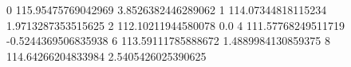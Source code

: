 0 115.95475769042969 3.8526382446289062
1 114.07344818115234 1.9713287353515625
2 112.10211944580078 0.0
4 111.57768249511719 -0.5244369506835938
6 113.59111785888672 1.4889984130859375
8 114.64266204833984 2.5405426025390625
